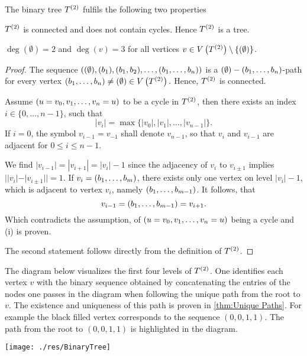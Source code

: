 \begin{thm}\label{thm:Binary Trees are Binary Trees}
The binary tree $\T$ fulfils the following two properties
\begin{thmlist}
\item $\T$ is connected and does not contain cycles. Hence $\T$ is a tree.
\item $\deg(\emptyset)=2$ and $\deg(v)=3$ for all vertices $v\in\VT\setminus\lbrace(\emptyset)\rbrace$.
\end{thmlist}
\end{thm}
\begin{proof}
The sequence $((\emptyset),(b_1),(b_1,b_2),\ldots,(\seq{b}))$ is a $(\emptyset)-(\seq{b})$-path for every vertex $(\seq{b})\neq(\emptyset)\in\VT.$ Hence, $\T$ is connected.

Assume $(u=v_0,\seq{v}=u)$ to be a cycle in $\T$, then there exists an index $i\in\lbrace 0,\ldots,n-1\rbrace$, such that 
\begin{equation*}
|v_i|=\max\lbrace |v_0|,|v_1|,\ldots,|v_{n-1}|\rbrace.
\end{equation*}
If $i=0$, the symbol $v_{i-1}=v_{-1}$ shall denote $v_{n-1}$, so that $v_i$ and $v_{i-1}$ are adjacent for $0\leq i\leq n-1$.

We find $|v_{i-1}|=|v_{i+1}|=|v_i|-1$ since the adjacency of $v_i$ to $v_{i\pm 1}$ implies $||v_i|-|v_{i\pm 1}||=1.$ If $v_i=(\seq[m]{b})$, there exists only one vertex on level $|v_i|-1$, which is adjacent to vertex $v_i$, namely $(\seq[m-1]{b})$. It follows, that
\begin{equation*}
v_{i-1}=(\seq[m-1]{b})=v_{i+1}.
\end{equation*}
Which contradicts the assumption, of $(u=v_0,\seq{v}=u)$ being a cycle and (i) is proven.

The second statement follows directly from the definition of $\T$.
\end{proof}

The diagram below visualizes the first four levels of $\T$. One identifies each vertex $v$ with the binary sequence obtained by concatenating the entries of the nodes one passes in the diagram when following the unique path from the root to $v$. The existence and uniqueness of this path is proven in \cref{thm:Unique Paths}. For example the black filled vertex corresponds to the sequence $(0,0,1,1)$. The path from the root to $(0,0,1,1)$ is highlighted in the diagram. 

\begin{center}
\texttt{[image: ./res/BinaryTree]}
%
%
\end{center}

